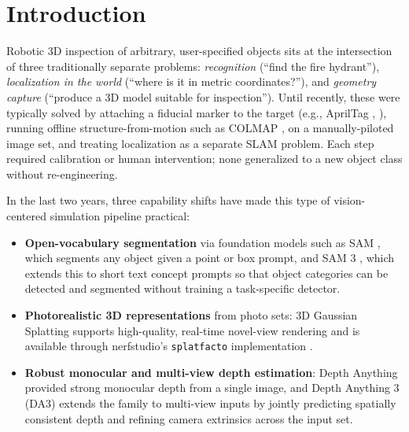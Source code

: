 \documentclass[conference]{IEEEtran}
\begin{document}
\section{Introduction}

Robotic 3D inspection of arbitrary, user-specified objects sits at the
intersection of three traditionally separate problems: \emph{recognition}
(``find the fire hydrant''), \emph{localization in the world}
(``where is it in metric coordinates?''), and \emph{geometry capture}
(``produce a 3D model suitable for inspection''). Until
recently, these were typically solved by attaching a fiducial marker
to the target (e.g., AprilTag \cite{olson2011apriltag},
\cite{wang2016apriltag2}), running offline structure-from-motion such
as COLMAP \cite{schonberger2016sfm}, \cite{schonberger2016mvs} on a
manually-piloted image set, and treating localization as a separate
SLAM problem. Each step required calibration or human intervention;
none generalized to a new object class without re-engineering.

In the last two years, three capability shifts have made this type of
vision-centered simulation pipeline practical:
\begin{itemize}
    \item \textbf{Open-vocabulary segmentation} via foundation models
    such as SAM \cite{kirillov2023sam}, which segments any object
    given a point or box prompt, and SAM 3 \cite{carion2025sam3},
    which extends this to short text concept prompts so that object
    categories can be detected and segmented without training a
    task-specific detector.
    \item \textbf{Photorealistic 3D representations} from photo sets:
    3D Gaussian Splatting \cite{kerbl2023_3dgs} supports high-quality,
    real-time novel-view rendering and is available through
    nerfstudio's \texttt{splatfacto} implementation
    \cite{tancik2023nerfstudio}.
    \item \textbf{Robust monocular and multi-view depth estimation}:
    Depth Anything \cite{yang2024depthanything} provided strong
    monocular depth from a single image, and Depth Anything 3 (DA3)
    \cite{lin2025da3} extends the family to multi-view inputs by
    jointly predicting spatially consistent depth and refining camera
    extrinsics across the input set.
\end{itemize}
\end{document}
